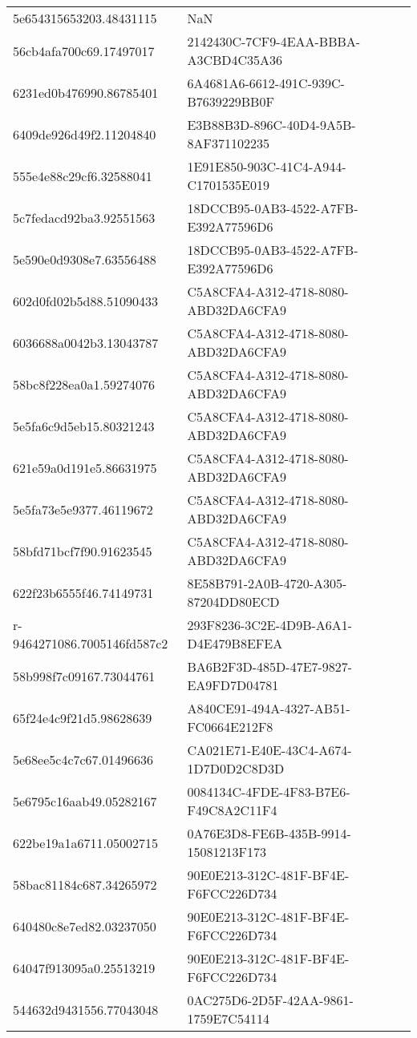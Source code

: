 \begin{tabular}{ll}
5e654315653203.48431115 & NaN \\
56cb4afa700c69.17497017 & 2142430C-7CF9-4EAA-BBBA-A3CBD4C35A36 \\
6231ed0b476990.86785401 & 6A4681A6-6612-491C-939C-B7639229BB0F \\
6409de926d49f2.11204840 & E3B88B3D-896C-40D4-9A5B-8AF371102235 \\
555e4e88c29cf6.32588041 & 1E91E850-903C-41C4-A944-C1701535E019 \\
5c7fedacd92ba3.92551563 & 18DCCB95-0AB3-4522-A7FB-E392A77596D6 \\
5e590e0d9308e7.63556488 & 18DCCB95-0AB3-4522-A7FB-E392A77596D6 \\
602d0fd02b5d88.51090433 & C5A8CFA4-A312-4718-8080-ABD32DA6CFA9 \\
6036688a0042b3.13043787 & C5A8CFA4-A312-4718-8080-ABD32DA6CFA9 \\
58bc8f228ea0a1.59274076 & C5A8CFA4-A312-4718-8080-ABD32DA6CFA9 \\
5e5fa6c9d5eb15.80321243 & C5A8CFA4-A312-4718-8080-ABD32DA6CFA9 \\
621e59a0d191e5.86631975 & C5A8CFA4-A312-4718-8080-ABD32DA6CFA9 \\
5e5fa73e5e9377.46119672 & C5A8CFA4-A312-4718-8080-ABD32DA6CFA9 \\
58bfd71bcf7f90.91623545 & C5A8CFA4-A312-4718-8080-ABD32DA6CFA9 \\
622f23b6555f46.74149731 & 8E58B791-2A0B-4720-A305-87204DD80ECD \\
r-9464271086.7005146fd587c2 & 293F8236-3C2E-4D9B-A6A1-D4E479B8EFEA \\
58b998f7c09167.73044761 & BA6B2F3D-485D-47E7-9827-EA9FD7D04781 \\
65f24e4c9f21d5.98628639 & A840CE91-494A-4327-AB51-FC0664E212F8 \\
5e68ee5c4c7c67.01496636 & CA021E71-E40E-43C4-A674-1D7D0D2C8D3D \\
5e6795c16aab49.05282167 & 0084134C-4FDE-4F83-B7E6-F49C8A2C11F4 \\
622be19a1a6711.05002715 & 0A76E3D8-FE6B-435B-9914-15081213F173 \\
58bac81184c687.34265972 & 90E0E213-312C-481F-BF4E-F6FCC226D734 \\
640480c8e7ed82.03237050 & 90E0E213-312C-481F-BF4E-F6FCC226D734 \\
64047f913095a0.25513219 & 90E0E213-312C-481F-BF4E-F6FCC226D734 \\
544632d9431556.77043048 & 0AC275D6-2D5F-42AA-9861-1759E7C54114 \\

\end{tabular}
